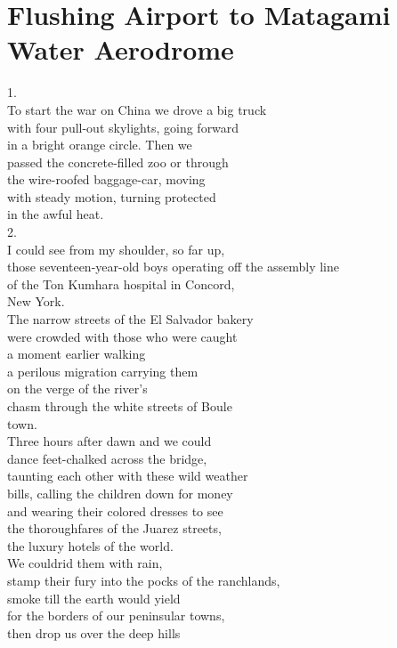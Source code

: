 \documentclass[smalldemyvopaper,11pt,twoside,onecolumn,openright,extrafontsizes]{memoir}
\newlength\drop
\begin{document}
\chapter{Flushing Airport to Matagami Water Aerodrome}
1.
\\To start the war on China we drove a big truck
\\with four pull-out skylights, going forward
\\in a bright orange circle. Then we
\\passed the concrete-filled zoo or through
\\the wire-roofed baggage-car, moving
\\with steady motion, turning protected
\\in the awful heat.
\\2.
\\I could see from my shoulder, so far up,
\\those seventeen-year-old boys operating off the assembly line
\\of the Ton Kumhara hospital in Concord,
\\New York.
\\The narrow streets of the El Salvador bakery
\\were crowded with those who were caught
\\a moment earlier walking
\\a perilous migration carrying them
\\on the verge of the river's
\\chasm through the white streets of Boule
\\town.
\\Three hours after dawn and we could
\\dance feet-chalked across the bridge,
\\taunting each other with these wild weather
\\bills, calling the children down for money
\\and wearing their colored dresses to see
\\the thoroughfares of the Juarez streets,
\\the luxury hotels of the world.
\\We couldrid them with rain,
\\stamp their fury into the pocks of the ranchlands,
\\smoke till the earth would yield
\\for the borders of our peninsular towns,
\\then drop us over the deep hills
\end{document}
